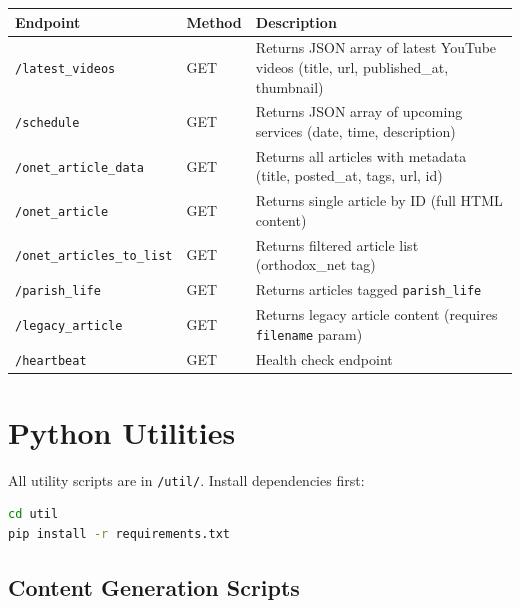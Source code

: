 \documentclass[12pt]{article}
\begin{document}
{\footnotesize
\begin{longtable}{p{4.2cm}p{1.5cm}p{6.8cm}}
\toprule
\textbf{Endpoint} & \textbf{Method} & \textbf{Description} \\
\midrule
\texttt{/latest\_videos} & GET & Returns JSON array of latest YouTube videos (title, url, published\_at, thumbnail) \\
\texttt{/schedule} & GET & Returns JSON array of upcoming services (date, time, description) \\
\texttt{/onet\_article\_data} & GET & Returns all articles with metadata (title, posted\_at, tags, url, id) \\
\texttt{/onet\_article} & GET & Returns single article by ID (full HTML content) \\
\texttt{/onet\_articles\_to\_list} & GET & Returns filtered article list (orthodox\_net tag) \\
\texttt{/parish\_life} & GET & Returns articles tagged \texttt{parish\_life} \\
\texttt{/legacy\_article} & GET & Returns legacy article content (requires \texttt{filename} param) \\
\texttt{/heartbeat} & GET & Health check endpoint \\
\bottomrule
\end{longtable}
}

\section{Python Utilities}

All utility scripts are in \texttt{/util/}. Install dependencies first:

\begin{lstlisting}[language=bash,numbers=none]
cd util
pip install -r requirements.txt
\end{lstlisting}

\subsection{Content Generation Scripts}
\end{document}
